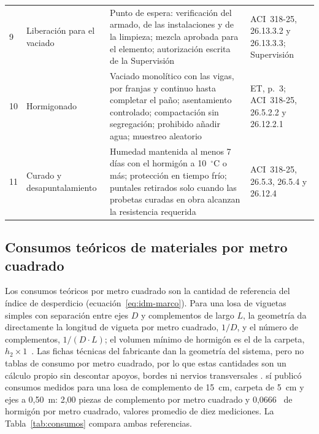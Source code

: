 \begin{longtable}{@{}P{0.55cm}P{2.65cm}P{8.8cm}P{3.65cm}@{}}
9 & Liberación para el vaciado & Punto de espera: verificación del armado, de las instalaciones y de la limpieza; mezcla aprobada para el elemento; autorización escrita de la Supervisión & ACI~318-25, 26.13.3.2 y 26.13.3.3; Supervisión \\
10 & Hormigonado & Vaciado monolítico con las vigas, por franjas y continuo hasta completar el paño; asentamiento controlado; compactación sin segregación; prohibido añadir agua; muestreo aleatorio & ET, p.~3; ACI~318-25, 26.5.2.2 y 26.12.2.1 \\
11 & Curado y desapuntalamiento & Humedad mantenida al menos 7 días con el hormigón a 10~$^{\circ}$C o más; protección en tiempo frío; puntales retirados solo cuando las probetas curadas en obra alcanzan la resistencia requerida & ACI~318-25, 26.5.3, 26.5.4 y 26.12.4 \\
\end{longtable}
\vspace{-6pt}
\endgroup

\subsection{Consumos teóricos de materiales por metro cuadrado}

Los consumos teóricos por metro cuadrado son la cantidad de referencia del índice de desperdicio (ecuación~\ref{eq:idm-marco}). Para una losa de viguetas simples con separación entre ejes $D$ y complementos de largo $L$, la geometría da directamente la longitud de vigueta por metro cuadrado, $1/D$, y el número de complementos, $1/(D \cdot L)$; el volumen mínimo de hormigón es el de la carpeta, $h_2 \times 1$~\mdos{}. Las fichas técnicas del fabricante dan la geometría del sistema, pero no tablas de consumo por metro cuadrado, por lo que estas cantidades son un cálculo propio sin descontar apoyos, bordes ni nervios transversales \parencite[hoja~3]{concretec2018viguetas}. \textcite[p.~103]{alcon2009} sí publicó consumos medidos para una losa de complemento de 15~cm, carpeta de 5~cm y ejes a 0,50~m: 2,00 piezas de complemento por metro cuadrado y 0,0666~\mtres{} de hormigón por metro cuadrado, valores promedio de diez mediciones. La Tabla~\ref{tab:consumos} compara ambas referencias.


